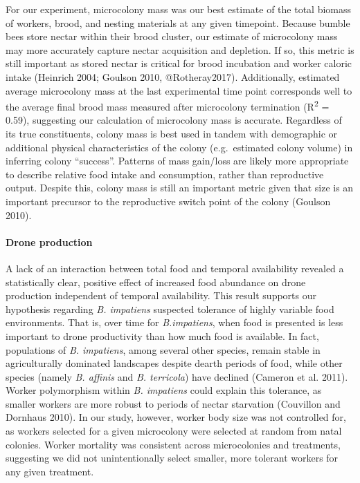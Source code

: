 \documentclass[11pt,]{article}
\let\oldparagraph\paragraph
\renewcommand{\paragraph}[1]{\oldparagraph{#1}\mbox{}}
\begin{document}
For our experiment, microcolony mass was our best estimate of the total
biomass of workers, brood, and nesting materials at any given timepoint.
Because bumble bees store nectar within their brood cluster, our
estimate of microcolony mass may more accurately capture nectar
acquisition and depletion. If so, this metric is still important as
stored nectar is critical for brood incubation and worker caloric intake
(Heinrich 2004; Goulson 2010, @Rotheray2017). Additionally, estimated
average microcolony mass at the last experimental time point corresponds
well to the average final brood mass measured after microcolony
termination (R\textsuperscript{2} = 0.59), suggesting our calculation of
microcolony mass is accurate. Regardless of its true constituents,
colony mass is best used in tandem with demographic or additional
physical characteristics of the colony (e.g.~estimated colony volume) in
inferring colony ``success''. Patterns of mass gain/loss are likely more
appropriate to describe relative food intake and consumption, rather
than reproductive output. Despite this, colony mass is still an
important metric given that size is an important precursor to the
reproductive switch point of the colony (Goulson 2010).

\hypertarget{drone-production}{%
\paragraph{Drone production}\label{drone-production}}

A lack of an interaction between total food and temporal availability
revealed a statistically clear, positive effect of increased food
abundance on drone production independent of temporal availability. This
result supports our hypothesis regarding \emph{B. impatiens} suspected
tolerance of highly variable food environments. That is, over time for
\emph{B.impatiens}, when food is presented is less important to drone
productivity than how much food is available. In fact, populations of
\emph{B. impatiens}, among several other species, remain stable in
agriculturally dominated landscapes despite dearth periods of food,
while other species (namely \emph{B. affinis} and \emph{B. terricola})
have declined (Cameron et al. 2011). Worker polymorphism within \emph{B.
impatiens} could explain this tolerance, as smaller workers are more
robust to periods of nectar starvation (Couvillon and Dornhaus 2010). In
our study, however, worker body size was not controlled for, as workers
selected for a given microcolony were selected at random from natal
colonies. Worker mortality was consistent across microcolonies and
treatments, suggesting we did not unintentionally select smaller, more
tolerant workers for any given treatment.
\end{document}

